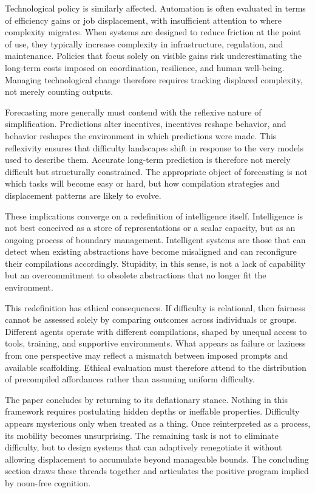 \documentclass[12pt]{article}
\begin{document}
Technological policy is similarly affected. Automation is often evaluated in terms of efficiency gains or job displacement, with insufficient attention to where complexity migrates. When systems are designed to reduce friction at the point of use, they typically increase complexity in infrastructure, regulation, and maintenance. Policies that focus solely on visible gains risk underestimating the long-term costs imposed on coordination, resilience, and human well-being. Managing technological change therefore requires tracking displaced complexity, not merely counting outputs.

Forecasting more generally must contend with the reflexive nature of simplification. Predictions alter incentives, incentives reshape behavior, and behavior reshapes the environment in which predictions were made. This reflexivity ensures that difficulty landscapes shift in response to the very models used to describe them. Accurate long-term prediction is therefore not merely difficult but structurally constrained. The appropriate object of forecasting is not which tasks will become easy or hard, but how compilation strategies and displacement patterns are likely to evolve.

These implications converge on a redefinition of intelligence itself. Intelligence is not best conceived as a store of representations or a scalar capacity, but as an ongoing process of boundary management. Intelligent systems are those that can detect when existing abstractions have become misaligned and can reconfigure their compilations accordingly. Stupidity, in this sense, is not a lack of capability but an overcommitment to obsolete abstractions that no longer fit the environment.

This redefinition has ethical consequences. If difficulty is relational, then fairness cannot be assessed solely by comparing outcomes across individuals or groups. Different agents operate with different compilations, shaped by unequal access to tools, training, and supportive environments. What appears as failure or laziness from one perspective may reflect a mismatch between imposed prompts and available scaffolding. Ethical evaluation must therefore attend to the distribution of precompiled affordances rather than assuming uniform difficulty.

The paper concludes by returning to its deflationary stance. Nothing in this framework requires postulating hidden depths or ineffable properties. Difficulty appears mysterious only when treated as a thing. Once reinterpreted as a process, its mobility becomes unsurprising. The remaining task is not to eliminate difficulty, but to design systems that can adaptively renegotiate it without allowing displacement to accumulate beyond manageable bounds. The concluding section draws these threads together and articulates the positive program implied by noun-free cognition.
\end{document}
